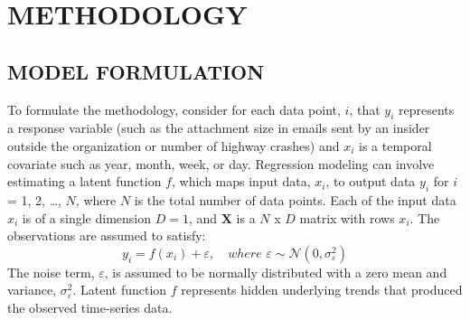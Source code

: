 \documentclass[letterpaper]{article}
\begin{document}
\section{METHODOLOGY}\label{methodology}

\subsection{MODEL FORMULATION}\label{model-formulation}

To formulate the methodology, consider for each data point, $i$, that $y_i$ represents a response variable (such as the attachment size in emails sent by an insider outside the organization or number of highway crashes) and $x_i$ is a temporal covariate such as year, month, week, or day. Regression modeling can involve estimating a latent function \(f\), which maps input data, $x_i$, to output data \(y_i\) for \(i\) = 1, 2, \ldots{}, \(N\), where \(N\) is the total number of data points. Each of the input data $x_i$ is of a single dimension $D = 1$, and \(\textbf{X}\) is a \(N\) x \(D\) matrix with rows $x_i$. The observations are assumed to satisfy:
\begin{equation}\label{eqn:additivenoise}
y_i = f(x_i) + \varepsilon, \quad where \, \, \varepsilon \sim \mathcal{N}(0, \sigma_{\varepsilon}^2)
\end{equation}
The noise term, $\varepsilon$, is assumed to be normally distributed with a zero mean and variance, $\sigma_{\varepsilon}^2$. Latent function \(f\) represents hidden underlying trends that produced the observed time-series data.
\end{document}
